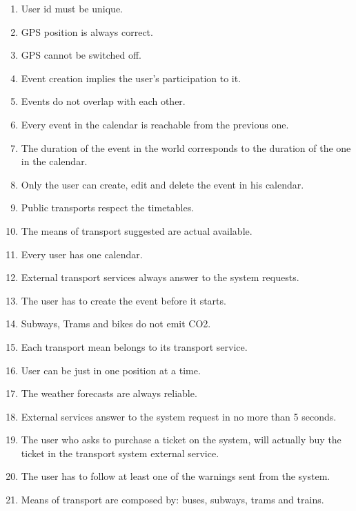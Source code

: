 \begin{enumerate}
	\setlength{\leftskip}{1cm}
	\item User id must be unique.
	\item GPS position is always correct.
	\item GPS cannot be switched off.
	\item Event creation implies the user’s participation to it.
	\item Events do not overlap with each other.
	\item Every event in the calendar is reachable from the previous one.
	\item The duration of the event in the world corresponds to the duration of the one in the calendar.
	\item Only the user can create, edit and delete the event in his calendar.
	\item Public transports respect the timetables.
	\item The means of transport suggested are actual available.
	\item Every user has one calendar.
	\item External transport services always answer to the system requests.
	\item The user has to create the event before it starts.
	\item Subways, Trams and bikes do not emit CO2.
	\item Each transport mean belongs to its transport service.
	\item User can be just in one position at a time.
	\item The weather forecasts are always reliable.
	\item External services answer to the system request in no more than 5 seconds.
	\item The user who asks to purchase a ticket on the system, will actually buy the ticket in the  transport system external service.
	\item The user has to follow at least one of the warnings sent from the system.
	\item Means of transport are composed by: buses, subways, trams and trains.
\end{enumerate}